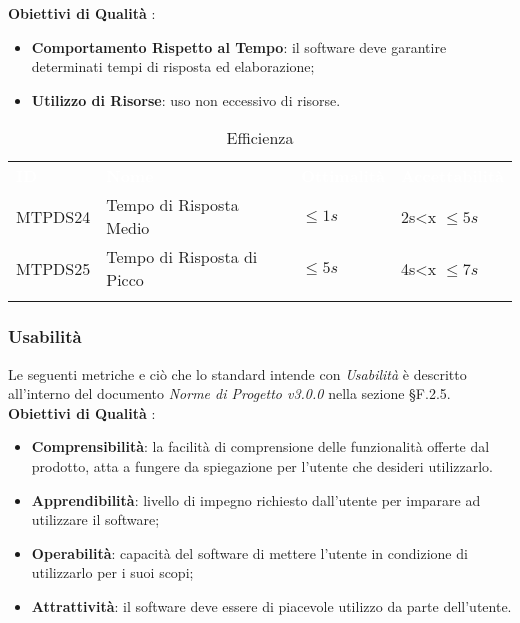 \textbf{Obiettivi di Qualità} :

\begin{itemize}
	\item \textbf{Comportamento Rispetto al Tempo}: il software deve garantire determinati tempi di risposta ed elaborazione;
	\item \textbf{Utilizzo di Risorse}: uso non eccessivo di risorse.
\end{itemize}

\begin{longtable}{|C{.15\textwidth}|C{.24\textwidth}|C{.24\textwidth}|C{.24\textwidth}|}
\hline
{}\textbf{\textcolor{white}{ID}} & \textbf{\textcolor{white}{Nome}} & \textbf{\textcolor{white}{Ottimalità}} & \textbf{\textcolor{white}{Accettabilità}}\\
MTPDS24 & Tempo di Risposta Medio & $\leq 1s$ & 2s<x $\leq 5s$\\
\hline
{}MTPDS25 & Tempo di Risposta di Picco  & $\leq 5s$ & 4s<x $\leq 7s$ \\ 
\hline
\caption{Efficienza}
\label{Efficienza}
\end{longtable}



\subsubsection{Usabilità}

Le seguenti metriche e ciò che lo standard intende con \textit{Usabilità} è descritto all'interno del documento \textit{Norme di Progetto v3.0.0} nella sezione §F.2.5. \\

\textbf{Obiettivi di Qualità} :

\begin{itemize}
	\item \textbf{Comprensibilità}: la facilità di comprensione delle funzionalità offerte dal prodotto, atta a fungere da spiegazione per l'utente che desideri utilizzarlo. 
	\item \textbf{Apprendibilità}: livello di impegno richiesto dall'utente per imparare ad utilizzare il software;
	\item \textbf{Operabilità}: capacità del software di mettere l'utente in condizione di utilizzarlo per i suoi scopi; 
	\item \textbf{Attrattività}: il software deve essere di piacevole utilizzo da parte dell'utente.
\end{itemize}

